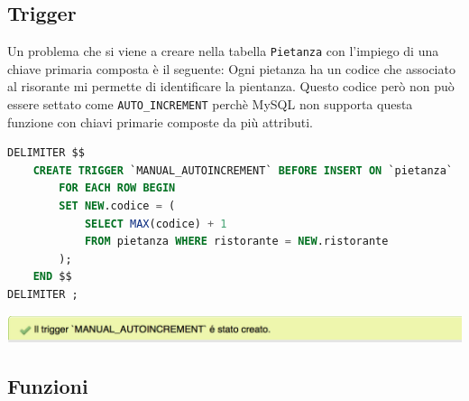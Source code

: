 \documentclass[10pt]{article}
\begin{document}
		\subsection{Trigger}
		Un problema che si viene a creare nella tabella \texttt{Pietanza} con l'impiego di una chiave primaria composta \`e il seguente: Ogni pietanza ha un codice che associato al risorante mi permette di identificare la pientanza. Questo codice per\`o non pu\`o essere settato come \texttt{AUTO\_INCREMENT} perch\`e MySQL non supporta questa funzione con chiavi primarie composte da pi\`u attributi.
		\begin{lstlisting}[language=sql]
DELIMITER $$		
	CREATE TRIGGER `MANUAL_AUTOINCREMENT` BEFORE INSERT ON `pietanza`
		FOR EACH ROW BEGIN
		SET NEW.codice = (
			SELECT MAX(codice) + 1
			FROM pietanza WHERE ristorante = NEW.ristorante
		);
	END $$		
DELIMITER ;
\end{lstlisting}
\begin{center}
\hspace*{-1cm}
\includegraphics[scale=0.9]{trigger1.png}
\hspace*{-1cm}
\end{center}
		\subsection{Funzioni}
\end{document}
